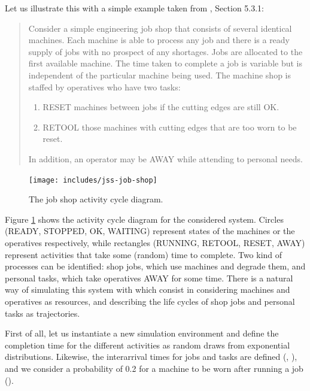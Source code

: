 \documentclass[
  nojss]{jss}
\providecommand{\tightlist}{%
  \setlength{\itemsep}{0pt}\setlength{\parskip}{0pt}}
\begin{document}
Let us illustrate this with a simple example taken from
\citet{Pidd:1988:Computer}, Section 5.3.1:

\begin{quote}
Consider a simple engineering job shop that consists of several
identical machines. Each machine is able to process any job and there is
a ready supply of jobs with no prospect of any shortages. Jobs are
allocated to the first available machine. The time taken to complete a
job is variable but is independent of the particular machine being used.
The machine shop is staffed by operatives who have two tasks:

\begin{enumerate}
\def\labelenumi{\arabic{enumi}.}
\tightlist
\item
  RESET machines between jobs if the cutting edges are still OK.
\item
  RETOOL those machines with cutting edges that are too worn to be
  reset.
\end{enumerate}

In addition, an operator may be AWAY while attending to personal needs.
\end{quote}

\begin{CodeChunk}
\begin{figure}

{\centering \texttt{[image: includes/jss-job-shop]} 

}

\caption[The job shop activity cycle diagram]{The job shop activity cycle diagram.}\label{fig:job-shop}
\end{figure}
\end{CodeChunk}

Figure \ref{fig:job-shop} shows the activity cycle diagram for the
considered system. Circles (READY, STOPPED, OK, WAITING) represent
states of the machines or the operatives respectively, while rectangles
(RUNNING, RETOOL, RESET, AWAY) represent activities that take some
(random) time to complete. Two kind of processes can be identified: shop
jobs, which use machines and degrade them, and personal tasks, which
take operatives AWAY for some time. There is a natural way of simulating
this system with  which consist in considering machines and
operatives as resources, and describing the life cycles of shop jobs and
personal tasks as trajectories.

First of all, let us instantiate a new simulation environment and define
the completion time for the different activities as random draws from
exponential distributions. Likewise, the interarrival times for jobs and
tasks are defined (, ), and we consider a
probability of 0.2 for a machine to be worn after running a job
().
\end{document}
